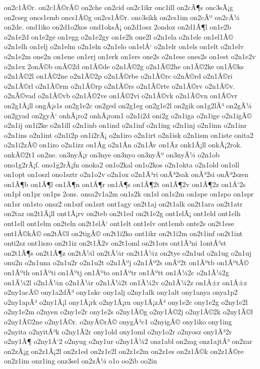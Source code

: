{on2c1Ã©r.
on2c1Ã©rÃ©
on2che
on2cid
on2c1ikr
onc1ill
on2cÃ¶s
onc3sÃ¡g
on2cseg
oncs1emb
oncs1Ã©g
on2cs1Ã©r.
onc3sikk
on2cs1im
on2cÃº
on2cÃ¼
on2de.
ond1iko
on2d1o2kos
ond1oksÃ¡
on2d1osz
2ondoz
on2d1Ã¶l
on1e2b
o2n1e2d
on1e2ge
on1egg
o2n1e2gy
on1e2h
one2l
o2n1ela
o2n1ele
on1el1Ã©
o2n1elh
on1elj
o2n1elm
o2n1eln
o2n1elo
on1elÅ‘
o2n1elr
on1els
on1elt
o2n1elv
o2n1e2m
one2n
on1ene
on1erj
on1erk
on1ers
one2s
o2n1ese
ones2s
on1est
o2n1e2v
o2n1ex
2onÃ©b
onÃ©2d
on1Ã©de
o2n1Ã©2g
o2n1Ã©2he
on1Ã©2ke
on1Ã©ks
o2n1Ã©2l
on1Ã©2ne
o2n1Ã©2p
o2n1Ã©rbe
o2n1Ã©rc
o2nÃ©rd
o2n1Ã©ri
o2n1Ã©rl
o2n1Ã©rm
o2n1Ã©rp
o2n1Ã©rs
o2n1Ã©rte
o2n1Ã©rv
o2n1Ã©v.
o2nÃ©vad
o2n1Ã©vb
o2n1Ã©2ve
on1Ã©2vi
o2n1Ã©vk
o2n1Ã©vn
on1Ã©vr
on2g1Ã¡ll
ongÃ¡s1s
on2g1e2c
on2ged
on2g1eg
on2g1e2l
on2gik
on1g2lÃ³
on2gÃ¼
on2gyad
on2gyÅ‘
onhÃ¡ro2
onhÃ¡rom1
o2n1i2d
oni2g
o2n1iga
o2n1ige
o2n1igÃ©
o2n1ij
on1i2ke
o2n1ill
o2n1inb
on1ind
o2n1inf
o2n1ing
o2n1inj
o2n1inn
o2n1inr
o2n1ins
o2n1int
o2n1i2p
on1i2rÃ¡
o2n1iro
o2n1irt
o2n1isk
o2n1ism
on1iste
onita2
o2n1i2zÃ©
on1izo
o2n1izz
on1Ã­g
o2n1Ã­n
o2n1Ã­v
on1Ã­z
onk1Ã¡ll
onkÃ¡2rok.
onkÃ©2t1
on2ne.
on3nyÃ¡r
on3nye
on3nyo
on3nyÃº
on3nyÃ¼
o2n1ob
ono1g2rÃ¡f.
ono1g2rÃ¡fn
onoka2
on1o2kal
on1o2kos
o2n1okta
o2n1old
on1oll
on1opt
on1oszl
ono1sztr
o2n1o2v
o2n1ox
o2n1Ã³ri
onÃ³2sak
onÃ³2si
onÃ³2szen
on1Ã¶b
on1Ã¶l
on1Ã¶n
on1Ã¶r
on1Ã¶s
on1Ã¶2t
on1Ã¶2v
on1Ã¶2z
on1Å‘2s
on1pl
on1pr
on1ps
2ons.
onsa2v1a2m
on1s2k
on1sl
on1s2m
on1spe
on1spo
on1spr
on1sr
on1sto
onsz2
on1szf
on1szt
ont1agy
on2t1aj
on2t1alk
on2t1ara
on2t1atr
on2taz
on2t1Ã¡ll
ont1Ã¡rv
on2teb
on2t1ed
on2t1e2g
ont1elÃ¡
ont1eld
ont1elh
ont1ell
ont1elm
on2teln
on2t1elÅ‘
ont1elt
ont1elv
ont1emb
onte2s
on2t1ese
ont1Ã©kÃ©
on2tÃ©l
on2tigÃ©
on2t1i2ko
ont1ikr
on2t1i2m
on2t1inf
on2t1int
onti2sz
ont1iszo
on2t1iz
on2t1Ã­2v
on2t1oml
on2t1ors
ont1Ã³ni
1ontÃ³st
on2t1Ã¶s
on2t1Ã¶z
on2tÃ¼l
on2tÃ¼r
on2t1Ã¼z
on2tye
o2n1ud
o2n1ug
o2n1uj
onu2n
o2n1una
o2n1u2r
o2n1u2t
o2n1Ãºj
o2n1Ãº2s
onÃº2t
on1Ãºtb
on1ÃºtÃ©
on1Ãºth
on1Ãºti
on1Ãºtj
on1Ãºto
on1Ãºtr
on1Ãºtt
on1Ã¼2c
o2n1Ã¼2g
on1Ã¼2l
o2n1Ã¼n
o2n1Ã¼r
o2n1Ã¼2t
on1Ã¼2v
o2n1Ã¼2z
on1Å±r
on1Å±z
o2ny1acÃ©
ony1a2dÃ³
ony1akc
ony1alj
o2ny1alk
ony1alt
ony1anya
onya1p2
o2ny1apÃ³
o2ny1Ã¡l
ony1Ã¡rk
o2ny1Ã¡rn
ony1Ã¡zÃ³
ony1e2c
ony1e2g
o2ny1e2l
o2ny1e2m
o2nyen
o2ny1e2r
ony1e2s
o2ny1Ã©g
o2ny1Ã©2j
o2ny1Ã©2k
o2ny1Ã©l
o2ny1Ã©2ne
o2ny1Ã©r.
o2nyÃ©rÃ©
onygÃ³c1
o2nyigÃ©
ony1iko
ony1ing
o2nyita
o2nyitÃ³k
o2ny1Ã­2r
ony1old
ony1oml
o2ny1o2r
o2nyosz
ony1Ã³2r
o2ny1Ã¶
o2ny1Å‘2
o2nyug
o2ny1ur
o2ny1Ã¼2
onz1abl
on2zag
onz1ajtÃ³
on2zar
on2zÃ¡g
on2z1Ã¡2l
on2z1ed
on2z1e2l
on2z1e2m
on2z1es
on2z1Ã©k
on2z1Ã©re
on2z1im
onz1ing
onz3sel
on2zÃ¼
o1o
oo2ib
oo2in
}
